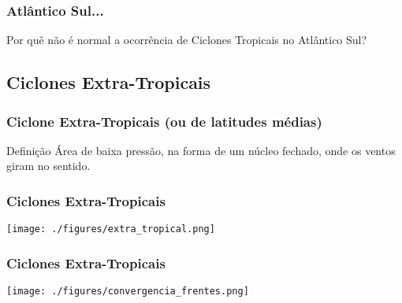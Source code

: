 \begin{frame}
\frametitle{Atlântico Sul...}
  \begin{block}{}
    Por quê não é normal a ocorrência de Ciclones Tropicais no Atlântico Sul?
  \end{block}
\end{frame}


\subsection{Ciclones Extra-Tropicais}
\begin{frame}
\frametitle{Ciclone Extra-Tropicais (ou de latitudes médias)}
  \begin{block}{Definição}
    Área de baixa pressão,  na forma de um núcleo fechado, onde os ventos
    giram no sentido.
  \end{block}
\end{frame}


\begin{frame}
\frametitle{Ciclones Extra-Tropicais}
  \begin{center}
    \texttt{[image: ./figures/extra\_tropical.png]}
  \end{center}
\end{frame}


\begin{frame}
\frametitle{Ciclones Extra-Tropicais}
  \begin{center}
    \texttt{[image: ./figures/convergencia\_frentes.png]}
  \end{center}
\end{frame}


%
%


